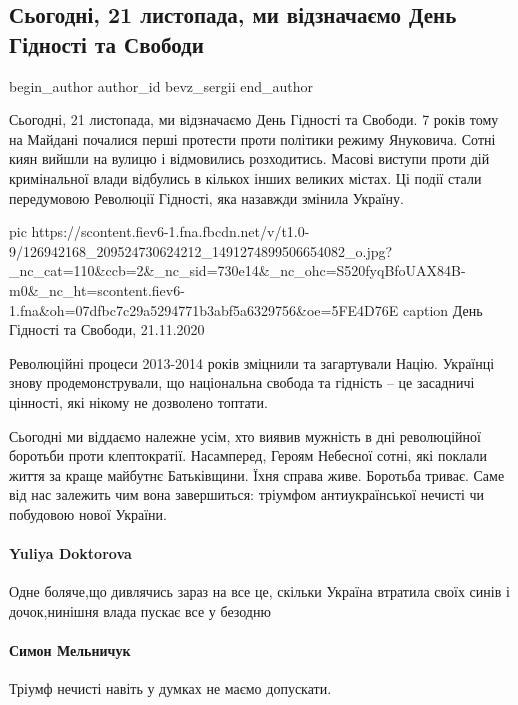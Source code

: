  
 
 
 
 
 
\subsection{Сьогодні, 21 листопада, ми відзначаємо День Гідності та Свободи}
\label{sec:21_11_2020.fb.bevz_sergii.1.den_gidnosti}
\ifcmt
	begin_author
   author_id bevz_sergii
	end_author
\fi

Сьогодні, 21 листопада, ми відзначаємо День Гідності та Свободи. 7 років тому
на Майдані почалися перші протести проти політики режиму Януковича. Сотні киян
вийшли на вулицю і відмовились розходитись. Масові виступи проти дій
кримінальної влади відбулись в кількох інших великих містах. Ці події стали
передумовою Революції Гідності, яка назавжди змінила Україну. 

\ifcmt
pic https://scontent.fiev6-1.fna.fbcdn.net/v/t1.0-9/126942168_209524730624212_1491274899506654082_o.jpg?_nc_cat=110&ccb=2&_nc_sid=730e14&_nc_ohc=S520fyqBfoUAX84B-m0&_nc_ht=scontent.fiev6-1.fna&oh=07dfbc7c29a5294771b3abf5a6329756&oe=5FE4D76E
caption День Гідності та Свободи, 21.11.2020
\fi

Революційні процеси 2013-2014 років зміцнили та загартували Націю. Українці
знову продемонстрували, що національна свобода та гідність – це засадничі
цінності, які нікому не дозволено топтати. 

Сьогодні ми віддаємо належне усім, хто виявив мужність в дні революційної
боротьби проти клептократії. Насамперед, Героям Небесної сотні, які поклали
життя за краще майбутнє Батьківщини. Їхня справа живе. Боротьба триває. Саме
від нас залежить чим вона завершиться: тріумфом антиукраїнської нечисті чи
побудовою нової України.

\paragraph{Yuliya Doktorova}
Одне боляче,що дивлячись зараз на все це, скільки Україна втратила своїх синів
і дочок,нинішня влада пускає все у безодню 

\paragraph{Симон Мельничук}
Тріумф нечисті навіть у думках не маємо допускати.
